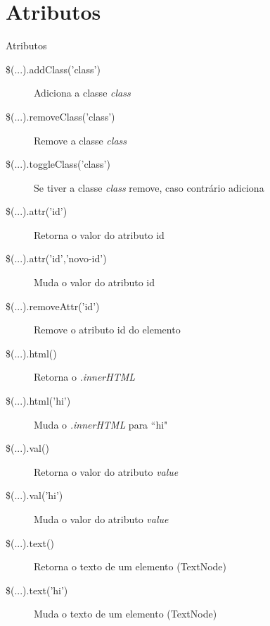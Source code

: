 \section{Atributos}
\begin{frame}{Atributos}
\begin{description}
	\item[\$(...).addClass('class')] Adiciona a classe \textit{class}
	\pause \item[\$(...).removeClass('class')] Remove a classe \textit{class}
	\pause \item[\$(...).toggleClass('class')] Se tiver a classe \textit{class} remove, caso contrário adiciona
	\pause \item[\$(...).attr('id')] Retorna o valor do atributo id
	\pause \item[\$(...).attr('id','novo-id')] Muda o valor do atributo id
	\pause \item[\$(...).removeAttr('id')] Remove o atributo id do elemento
	\pause \item[\$(...).html()] Retorna o \textit{.innerHTML}
	\pause \item[\$(...).html('hi')] Muda o \textit{.innerHTML} para ``hi"
	\pause \item[\$(...).val()] Retorna o valor do atributo \textit{value}
	\pause \item[\$(...).val('hi')] Muda o valor do atributo \textit{value}
	\pause \item[\$(...).text()] Retorna o texto de um elemento (TextNode)
	\pause \item[\$(...).text('hi')] Muda o texto de um elemento (TextNode)
\end{description}
\end{frame}
